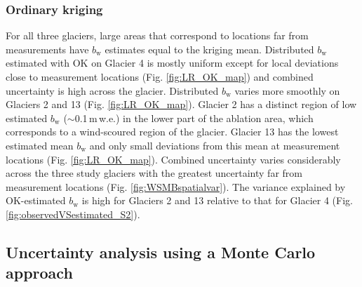 \documentclass[review,oneside, letterpaper]{igs}
\begin{document}
\subsubsection{Ordinary kriging}

For all three glaciers, large areas that correspond to locations far from measurements have $b_\mathrm{w}$ estimates equal to the kriging mean. Distributed $b_\mathrm{w}$ estimated with OK on Glacier 4 is mostly uniform except for local deviations close to measurement locations (Fig. \ref{fig:LR_OK_map}) and combined uncertainty is high across the glacier.
Distributed $b_\mathrm{w}$ varies more smoothly on Glaciers 2 and 13 (Fig. \ref{fig:LR_OK_map}). Glacier 2 has a distinct region of low estimated $b_\mathrm{w}$ ($\sim$0.1\,m\,w.e.) in the lower part of the ablation area, which corresponds to a wind-scoured region of the glacier. Glacier 13 has the lowest estimated mean $b_\mathrm{w}$ and only small deviations from this mean at measurement locations (Fig. \ref{fig:LR_OK_map}). Combined uncertainty varies considerably across the three study glaciers with the greatest uncertainty far from measurement locations (Fig. \ref{fig:WSMBspatialvar}). The variance explained by OK-estimated $b_\mathrm{w}$ is high for Glaciers 2 and 13  relative to that for Glacier 4 (Fig. \ref{fig:observedVSestimated_S2}). 

\subsection{Uncertainty analysis using a Monte Carlo approach}
\end{document}
